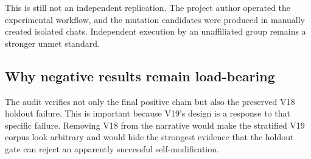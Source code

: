 This is still not an independent replication. The project author operated the experimental workflow, and the mutation candidates were produced in manually created isolated chats. Independent execution by an unaffiliated group remains a stronger unmet standard.

\subsection{Why negative results remain load-bearing}

The audit verifies not only the final positive chain but also the preserved V18 holdout failure. This is important because V19's design is a response to that specific failure. Removing V18 from the narrative would make the stratified V19 corpus look arbitrary and would hide the strongest evidence that the holdout gate can reject an apparently successful self-modification.
